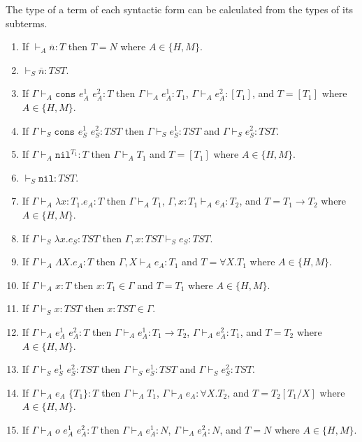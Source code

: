 \begin{lemma}
\label{i}
The type of a term of each syntactic form can be calculated from the types of its subterms.
\begin{enumerate}
\item If $\vdash_{A}\overline{n}:T$ then $T=N$ where $A\in\lbrace H,M\rbrace$.
\item $\vdash_{S}\overline{n}:TST$.
\item If $\Gamma\vdash_{A}\mathtt{cons}$ $e_{A}^{1}$ $e_{A}^{2}:T$ then $\Gamma\vdash_{A}e_{A}^{1}:T_{1}$, $\Gamma\vdash_{A}e_{A}^{2}:[T_{1}]$, and $T=[T_{1}]$ where $A\in\lbrace H,M\rbrace$.
\item If $\Gamma\vdash_{S}\mathtt{cons}$ $e_{S}^{1}$ $e_{S}^{2}:TST$ then $\Gamma\vdash_{S}e_{S}^{1}:TST$ and $\Gamma\vdash_{S}e_{S}^{2}:TST$.
\item If $\Gamma\vdash_{A}\mathtt{nil}^{T_{1}}:T$ then $\Gamma\vdash_{A}T_{1}$ and $T=[T_{1}]$ where $A\in\lbrace H,M\rbrace$.
\item $\vdash_{S}\mathtt{nil}:TST$.
\item If $\Gamma\vdash_{A}\lambda x:T_{1}.e_{A}:T$ then $\Gamma\vdash_{A}T_{1}$, $\Gamma,x:T_{1}\vdash_{A}e_{A}:T_{2}$, and $T=T_{1}\rightarrow T_{2}$ where $A\in\lbrace H,M\rbrace$.
\item If $\Gamma\vdash_{S}\lambda x.e_{S}:TST$ then $\Gamma,x:TST\vdash_{S}e_{S}:TST$.
\item If $\Gamma\vdash_{A}\Lambda X.e_{A}:T$ then $\Gamma,X\vdash_{A}e_{A}:T_{1}$ and $T=\forall X.T_{1}$ where $A\in\lbrace H,M\rbrace$.
\item If $\Gamma\vdash_{A}x:T$ then $x:T_{1}\in\Gamma$ and $T=T_{1}$ where $A\in\lbrace H,M\rbrace$.
\item If $\Gamma\vdash_{S}x:TST$ then $x:TST\in\Gamma$.
\item If $\Gamma\vdash_{A}e_{A}^{1}$ $e_{A}^{2}:T$ then $\Gamma\vdash_{A}e_{A}^{1}:T_{1}\rightarrow T_{2}$, $\Gamma\vdash_{A}e_{A}^{2}:T_{1}$, and $T=T_{2}$ where $A\in\lbrace H,M\rbrace$.
\item If $\Gamma\vdash_{S}e_{S}^{1}$ $e_{S}^{2}:TST$ then $\Gamma\vdash_{S}e_{S}^{1}:TST$ and $\Gamma\vdash_{S}e_{S}^{2}:TST$.
\item If $\Gamma\vdash_{A}e_{A}$ $\lbrace T_{1}\rbrace:T$ then $\Gamma\vdash_{A}T_{1}$, $\Gamma\vdash_{A}e_{A}:\forall X.T_{2}$, and $T=T_{2}[T_{1}/X]$ where $A\in\lbrace H,M\rbrace$.
\item If $\Gamma\vdash_{A}o$ $e_{A}^{1}$ $e_{A}^{2}:T$ then $\Gamma\vdash_{A}e_{A}^{1}:N$, $\Gamma\vdash_{A}e_{A}^{2}:N$, and $T=N$ where $A\in\lbrace H,M\rbrace$.

\end{enumerate}
\end{lemma}
